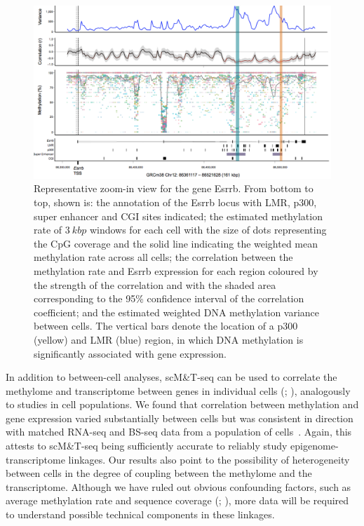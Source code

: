 \begin{figure}[htbp!]
\centering
\includegraphics[width=1.0\textwidth]{zoom}
\caption[Representative zoom-in view for the gene Esrrb.]{Representative zoom-in view for the gene Esrrb. From bottom to top, shown is: the annotation of the Esrrb locus with LMR, p300, super enhancer and CGI sites indicated; the estimated methylation rate of $3~kbp$ windows for each cell with the size of dots representing the CpG coverage and the solid line indicating the weighted mean methylation rate across all cells; the correlation between the methylation rate and Esrrb expression for each region coloured by the strength of the correlation and with the shaded area corresponding to the 95\% confidence interval of the correlation coefficient; and the estimated weighted DNA methylation variance between cells. The vertical bars denote the location of a p300 (yellow) and LMR (blue) region, in which DNA methylation is significantly associated with gene expression.}
\label{fig:mt_zoom}
\end{figure}

In addition to between-cell analyses, scM\&T-seq can be used to correlate the methylome and transcriptome between genes in individual cells (; ), analogously to studies in cell populations. We found that correlation between methylation and gene expression varied substantially between cells but was consistent in direction with matched RNA-seq and BS-seq data from a population of cells~\citep{ficz_fgf_2013}. Again, this attests to scM\&T-seq being sufficiently accurate to reliably study epigenome-transcriptome linkages. Our results also point to the possibility of heterogeneity between cells in the degree of coupling between the methylome and the transcriptome. Although we have ruled out obvious confounding factors, such as average methylation rate and sequence coverage (; ), more data will be required to understand possible technical components in these linkages.

